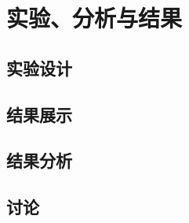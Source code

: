 \section{实验、分析与结果}


\subsection{实验设计}


\subsection{结果展示}

%

\subsection{结果分析}


\subsection{讨论}

